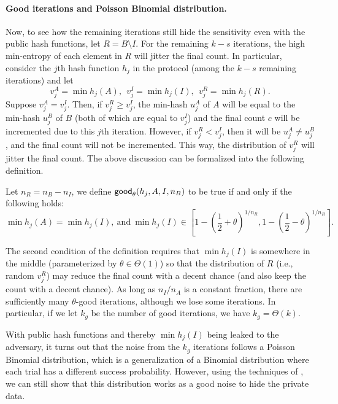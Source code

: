 \paragraph{Good iterations and Poisson Binomial distribution.}
Now, to see how the remaining iterations still hide the sensitivity even with the public hash functions, let  
$R = B \setminus I$. 
%
For the remaining $k-s$ iterations, the high min-entropy of each element in $R$ will jitter
the final count. In particular, consider the $j$th hash
function $h_j$ in the protocol (among the $k-s$ remaining iterations) and let
\[v_j^A = \min h_j(A),~~
v_j^I = \min h_j(I),~~
v_j^R = \min h_j(R).\]
%
Suppose $v_j^A = v_j^I$. Then, if $v_j^R \ge v_j^I$, the
min-hash $u_j^A$ of $A$ will be equal to the min-hash $u_j^B$ of $B$ (both of which are equal to $v_j^I$)
and the
final count $c$ will be incremented due to this $j$th iteration.
%
However, if $v_j^R < v_j^I$, then it will be $u_j^A \ne u_j^B$, and the
final count will not be incremented. This way, the distribution of $v_j^R$
will jitter the final count. 
%
The above discussion can be formalized into the following definition. 
\begin{definition}\label{def:theta-good}
Let $n_R = n_B - n_I$, we define 
$\mathsf{good}_\theta(h_j, A, I, n_B)$ to be true if and only if the following
holds: 
\[ \min h_j(A) = \min h_j(I), ~\mbox{and}~
    \min h_j(I) \in
    \left[1-\left(\frac{1}{2}+\theta\right)^{1/n_R}, 
        1-\left(\frac{1}{2}-\theta\right)^{1/n_R}\right].\]
\end{definition}
The second condition of the definition requires that $\min h_j(I)$ is somewhere in the middle (parameterized by $\theta \in \Theta(1)$) so that the distribution of $R$ (i.e., random $v_j^R$) may reduce the final count with a decent chance (and also keep the count with a decent chance).
%
As long as $n_I/n_A$ is a constant fraction, there are sufficiently many $\theta$-good iterations, although we lose some iterations.
In particular, if we let $k_g$ be the number of good iterations, we have $k_g = \Theta(k)$. 

With public hash functions and thereby $\min h_j(I)$ being leaked to the adversary, it turns out that the noise from the $k_g$ iterations follows a Poisson Binomial distribution, which is a generalization of a Binomial distribution where each trial has a different success probability. However, using the techniques of \cite{COK22}, we can still show that this distribution works as a good noise to hide the private data. 

